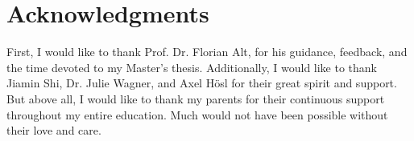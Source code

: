 
\section*{Acknowledgments}

First, I would like to thank Prof. Dr. Florian Alt, for his guidance, feedback, and the time devoted to my Master's thesis. Additionally, I would like to thank Jiamin Shi, Dr. Julie Wagner, and Axel H{\"o}sl for their great spirit and support. But above all, I would like to thank my parents for their continuous support throughout my entire education. Much would not have been possible without their love and care. 
